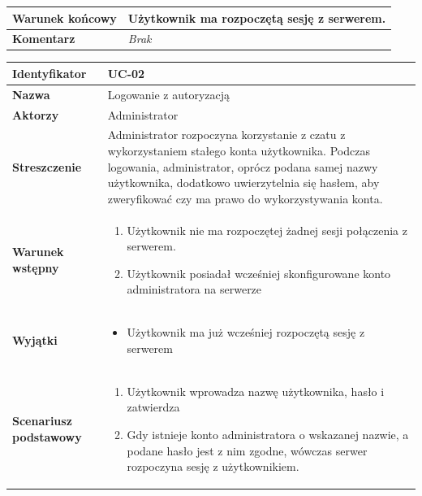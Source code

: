 {\begin{tabularx}{\textwidth}{|l|X|}
	\hline
		\textbf{Warunek końcowy} &
			Użytkownik ma rozpoczętą sesję z serwerem.
		\\

	\hline
		\textbf{Komentarz} &
			\textit{Brak}
		\\

	\hline
\end{tabularx}

\vspace{2em}

\begin{tabularx}{\textwidth}{|l|X|}
	\hline
		\textbf{Identyfikator} &
		UC-02
		\\

	\hline
		\textbf{Nazwa} &
		Logowanie z autoryzacją
		\\

	\hline
		\textbf{Aktorzy} &
			Administrator
		\\

	\hline
		\textbf{Streszczenie} &
			Administrator rozpoczyna korzystanie z czatu z wykorzystaniem stałego
			konta użytkownika. Podczas logowania, administrator, oprócz podana samej
			nazwy użytkownika, dodatkowo uwierzytelnia się hasłem, aby zweryfikować
			czy ma prawo do wykorzystywania konta.
		\\

	\hline
		\textbf{Warunek wstępny} &
			\begin{enumerate}
				\item Użytkownik nie ma rozpoczętej żadnej sesji połączenia z serwerem.
				\item Użytkownik posiadał wcześniej skonfigurowane konto administratora
				na serwerze
			\end{enumerate}
		\\

	\hline
		\textbf{Wyjątki} &
			\begin{itemize}
				\item Użytkownik ma już wcześniej rozpoczętą sesję z serwerem
			\end{itemize}
		\\

	\hline
		\textbf{Scenariusz podstawowy} &
			\begin{enumerate}
				\item Użytkownik wprowadza nazwę użytkownika, hasło	i zatwierdza
				\item Gdy istnieje konto administratora o wskazanej nazwie, a podane
				hasło jest z nim zgodne, wówczas serwer rozpoczyna sesję z
				użytkownikiem.
			\end{enumerate}
		\\


\end{tabularx}}
